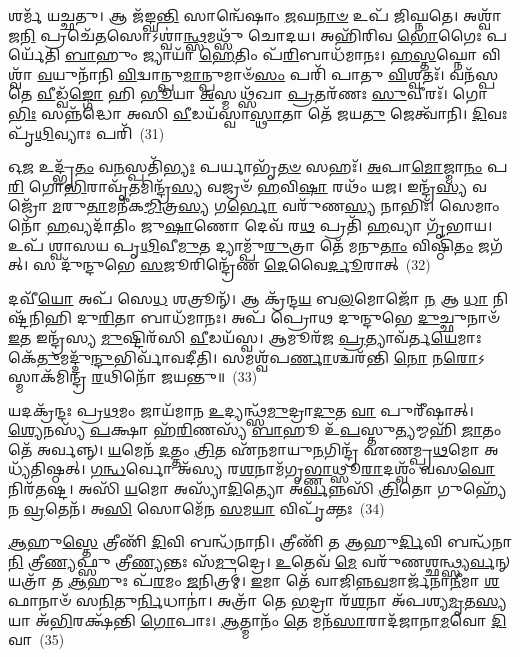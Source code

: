 𑌶𑌰𑍍𑌮᳴ 𑌯𑌚𑍍𑌛𑌤𑍁। 𑌆 𑌜᳴𑌙𑍍𑌘\-\ul{𑌨𑍍𑌤𑌿} 𑌸𑌾𑌨𑍍𑌵𑍇᳴𑌷𑌾𑌂 \ul{𑌜}\-𑌘\-\ul{𑌨𑌾}\-\-\ul{𑍞} 𑌉𑌪᳴ 𑌜𑌿𑌘𑍍𑌨𑌤𑍇। 𑌅𑌶𑍍𑌵𑌾᳴𑌜\-\ul{𑌨𑌿} 𑌪𑍍𑌰𑌚𑍇᳴\-\ul{𑌤}\-𑌸𑍋\-𑌽𑌶𑍍𑌵𑌾॑\-\ul{𑌨𑍍𑌥𑍍𑌸}\-𑌮𑌥𑍍𑌸𑍁᳴ 𑌚𑍋𑌦𑌯। 𑌅𑌹𑌿᳴𑌰𑌿𑌵 \ul{𑌭𑍋}\-𑌗𑍈𑌃 𑌪𑌰𑍍𑌯𑍇᳴𑌤𑌿 \ul{𑌬𑌾}\-𑌹𑍁𑌂 𑌜𑍍𑌯𑌾𑌯𑌾᳴ \ul{𑌹𑍇}\-𑌤𑌿𑌂 𑌪᳴\-\ul{𑌰𑌿}\-𑌬𑌾𑌧᳴𑌮𑌾𑌨𑌃। \ul{𑌹}\-\-\ul{𑌸𑍍𑌤}\-𑌘𑍍𑌨𑍋 𑌵𑌿𑌶𑍍𑌵𑌾᳴ \ul{𑌵}\-𑌯𑍁𑌨𑌾᳴𑌨𑌿 \ul{𑌵𑌿}\-𑌦𑍍𑌵𑌾𑌨𑍍𑌪𑍁\-\ul{𑌮𑌾}\-𑌨𑍍𑌪𑍁𑌮𑌾𑍞᳴\-\ul{𑌸𑌂} 𑌪𑌰𑌿᳴ 𑌪𑌾𑌤𑍁 \ul{𑌵𑌿}\-𑌶𑍍𑌵𑌤𑌃᳴। 𑌵𑌨᳴𑌸𑍍𑌪𑌤𑍇 \ul{𑌵𑍀}\-𑌡𑍍𑌵᳴\-\ul{𑌙𑍍𑌗𑍋} 𑌹𑌿 \ul{𑌭𑍂}\-𑌯𑌾 \ul{𑌅}\-𑌸𑍍𑌮𑌥𑍍𑌸᳴𑌖𑌾 \ul{𑌪𑍍𑌰}\-𑌤𑌰᳴𑌣𑌃 \ul{𑌸𑍁}\-𑌵𑍀𑌰𑌃᳴। 𑌗𑍋\-\ul{𑌭𑌿𑌃} 𑌸𑌨𑍍𑌨᳴𑌦𑍍𑌧𑍋 𑌅𑌸𑌿 \ul{𑌵𑍀}\-𑌡𑌯᳴𑌸𑍍𑌵𑌾\-\ul{𑌸𑍍𑌥𑌾}\-𑌤𑌾 𑌤𑍇᳴ 𑌜𑌯\-\ul{𑌤𑍁} 𑌜𑍇𑌤𑍍𑌵𑌾᳴𑌨𑌿। \ul{𑌦𑌿}\-𑌵𑌃 𑌪𑍃᳴\-\ul{𑌥𑌿}\-𑌵𑍍𑌯𑌾𑌃 𑌪𑌰𑌿᳴~(31)

𑌓\-\ul{𑌜} 𑌉𑌦𑍍𑌭𑍃᳴\-\ul{𑌤𑌂} 𑌵\-\ul{𑌨}\-𑌸𑍍𑌪𑌤𑌿᳴\-\ul{𑌭𑍍𑌯𑌃} 𑌪𑌰𑍍𑌯𑌾𑌭𑍃᳴\-\ul{𑌤}\-\-\ul{𑍞} 𑌸𑌹𑌃᳴। \ul{𑌅}\-𑌪𑌾\-\ul{𑌮𑍋}\-𑌜𑍍𑌮𑌾\-\ul{𑌨𑌂} 𑌪\-\ul{𑌰𑌿} 𑌗𑍋\-\ul{𑌭𑌿}\-𑌰𑌾𑌵𑍃᳴\-\ul{𑌤}\-𑌮𑌿𑌨𑍍𑌦𑍍𑌰᳴\-\ul{𑌸𑍍𑌯} 𑌵𑌜𑍍𑌰𑍞᳴ \ul{𑌹}\-𑌵𑌿\-\ul{𑌷𑌾} 𑌰𑌥𑌂᳴ 𑌯𑌜। 𑌇𑌨𑍍𑌦𑍍𑌰᳴\-\ul{𑌸𑍍𑌯} 𑌵𑌜𑍍𑌰𑍋᳴ \ul{𑌮}\-𑌰𑍁\-\ul{𑌤𑌾}\-𑌮𑌨𑍀᳴𑌕\-\ul{𑌮𑍍𑌮𑌿}\-𑌤𑍍𑌰\-\ul{𑌸𑍍𑌯} 𑌗\-\ul{𑌰𑍍𑌭𑍋} 𑌵𑌰𑍁᳴𑌣\-\ul{𑌸𑍍𑌯} 𑌨𑌾𑌭𑌿𑌃᳴। 𑌸𑍇𑌮𑌾𑌂 𑌨𑍋᳴ \ul{𑌹}\-𑌵𑍍𑌯𑌦𑌾᳴𑌤𑌿𑌂 𑌜𑍁\-\ul{𑌷𑌾}\-𑌣𑍋 𑌦𑍇𑌵᳴ 𑌰\-\ul{𑌥} 𑌪𑍍𑌰𑌤𑌿᳴ \ul{𑌹}\-𑌵𑍍𑌯𑌾 𑌗𑍃᳴𑌭𑌾𑌯। 𑌉𑌪᳴ 𑌶𑍍𑌵𑌾𑌸𑌯 𑌪𑍃\-\ul{𑌥𑌿}\-𑌵𑍀\-\ul{𑌮𑍁}\-𑌤 𑌦𑍍𑌯𑌾𑌮𑍍𑌪𑍁᳴\-\ul{𑌰𑍁}\-𑌤𑍍𑌰𑌾 𑌤𑍇᳴ 𑌮𑌨𑍁\-\ul{𑌤𑌾𑌂} 𑌵𑌿𑌷𑍍𑌠𑌿᳴\-\ul{𑌤𑌂} 𑌜𑌗᳴𑌤𑍍। 𑌸 𑌦𑍁᳴𑌨𑍍𑌦𑍁𑌭𑍇 \ul{𑌸}\-𑌜𑍂𑌰𑌿𑌨𑍍𑌦𑍍𑌰𑍇᳴𑌣 \ul{𑌦𑍇}\-𑌵𑍈\-\ul{𑌰𑍍𑌦𑍂}\-𑌰𑌾𑌤𑍍~(32)

𑌦𑌵𑍀᳴\-\ul{𑌯𑍋} 𑌅𑌪᳴ 𑌸𑍇\-\ul{𑌧} 𑌶𑌤𑍍𑌰𑍂𑌨𑍍᳴। 𑌆 𑌕𑍍𑌰᳴𑌨𑍍𑌦\-\ul{𑌯} 𑌬\-\ul{𑌲}\-𑌮𑍋𑌜𑍋᳴ \ul{𑌨} 𑌆 \ul{𑌧𑌾} 𑌨𑌿 𑌷𑍍𑌟᳴𑌨𑌿𑌹𑌿 𑌦𑍁\-\ul{𑌰𑌿}\-𑌤𑌾 𑌬𑌾𑌧᳴𑌮𑌾𑌨𑌃। 𑌅𑌪᳴ 𑌪𑍍𑌰𑍋𑌥 𑌦𑍁𑌨𑍍𑌦𑍁𑌭𑍇 \ul{𑌦𑍁}\-𑌚𑍍𑌛𑍁𑌨𑌾𑍞᳴ \ul{𑌇}\-𑌤 𑌇𑌨𑍍𑌦𑍍𑌰᳴𑌸𑍍𑌯 \ul{𑌮𑍁}\-𑌷𑍍𑌟𑌿𑌰᳴𑌸𑌿 \ul{𑌵𑍀}\-𑌡𑌯᳴𑌸𑍍𑌵। 𑌆𑌮𑍂𑌰᳴𑌜 \ul{𑌪𑍍𑌰}\-𑌤𑍍𑌯𑌾𑌵᳴𑌰𑍍𑌤\-\ul{𑌯𑍇}\-𑌮𑌾𑌃 𑌕𑍇᳴\-\ul{𑌤𑍁}\-𑌮𑌦𑍍𑌦𑍁᳴\-\ul{𑌨𑍍𑌦𑍁}\-𑌭𑌿𑌰𑍍𑌵𑌾᳴𑌵𑌦𑍀𑌤𑌿। 𑌸𑌮𑌶𑍍𑌵᳴𑌪\-\ul{𑌰𑍍𑌣𑌾}\-𑌶𑍍𑌚𑌰᳴𑌨𑍍𑌤𑌿 \ul{𑌨𑍋} 𑌨\-\ul{𑌰𑍋}\-\-𑌽𑌸𑍍𑌮𑌾𑌕᳴𑌮𑌿𑌨𑍍𑌦𑍍𑌰 \ul{𑌰}\-𑌥𑌿𑌨𑍋᳴ 𑌜𑌯𑌨𑍍𑌤𑍁॥~(33)

{\anuvakamend[{𑌧𑌨𑍍𑌵᳴𑌨𑍍𑌮\-\ul{𑌹𑌿}\-𑌮𑌾\-\ul{𑌨𑌂} 𑌬𑍍𑌰𑌾𑌹𑍍𑌮᳴\-\ul{𑌣𑌾}\-𑌸𑍋\-𑌽𑌦𑌿᳴𑌤𑌿𑌃 𑌪𑍃\-\ul{𑌥𑌿}\-𑌵𑍍𑌯𑌾𑌃 𑌪𑌰𑌿᳴ \ul{𑌦𑍂}\-𑌰𑌾𑌦𑍇𑌕᳴𑌚𑌤𑍍𑌵𑌾𑌰𑌿𑍞𑌶𑌚𑍍𑌚}]}%

𑌯𑌦𑌕𑍍𑌰᳴𑌨𑍍𑌦𑌃 𑌪𑍍𑌰\-\ul{𑌥}\-𑌮𑌂 𑌜𑌾𑌯᳴𑌮𑌾𑌨 \ul{𑌉}\-𑌦𑍍𑌯𑌨𑍍𑌥𑍍𑌸᳴\-\ul{𑌮𑍁}\-𑌦𑍍𑌰𑌾\-\ul{𑌦𑍁}\-𑌤 \ul{𑌵𑌾} 𑌪𑍁𑌰𑍀᳴𑌷𑌾𑌤𑍍। \ul{𑌶𑍍𑌯𑍇}\-𑌨𑌸𑍍𑌯᳴ \ul{𑌪}\-𑌕𑍍𑌷𑌾 𑌹᳴\-\ul{𑌰𑌿}\-𑌣𑌸𑍍𑌯᳴ \ul{𑌬𑌾}\-𑌹𑍂 𑌉᳴\-\ul{𑌪}\-𑌸𑍍𑌤𑍁\-\ul{𑌤𑍍𑌯}\-𑌮𑍍𑌮𑌹𑌿᳴ \ul{𑌜𑌾}\-𑌤𑌂 𑌤𑍇᳴ 𑌅𑌰𑍍𑌵𑌨𑍍𑌨𑍍। \ul{𑌯}\-𑌮𑍇𑌨᳴ \ul{𑌦}\-𑌤𑍍𑌤𑌂 \ul{𑌤𑍍𑌰𑌿}\-𑌤 𑌏᳴𑌨𑌮𑌾𑌯𑍁\-\ul{𑌨}\-𑌗𑌿𑌨𑍍𑌦𑍍𑌰᳴ 𑌏𑌣𑌮𑍍𑌪𑍍𑌰\-\ul{𑌥}\-𑌮𑍋 𑌅𑌧𑍍𑌯᳴𑌤𑌿𑌷𑍍𑌠𑌤𑍍। \ul{𑌗}\-\-\ul{𑌨𑍍𑌧}\-𑌰𑍍𑌵𑍋 𑌅᳴𑌸𑍍𑌯 𑌰\-\ul{𑌶}\-𑌨𑌾𑌮᳴𑌗𑍃\-\ul{𑌭𑍍𑌣𑌾}\-𑌥𑍍𑌸𑍂\-\ul{𑌰𑌾}\-𑌦𑌶𑍍𑌵𑌂᳴ 𑌵𑌸\-\ul{𑌵𑍋} 𑌨𑌿𑌰᳴𑌤𑌷𑍍𑌟। 𑌅𑌸𑌿᳴ \ul{𑌯}\-𑌮𑍋 𑌅𑌸𑍍𑌯𑌾᳴\-\ul{𑌦𑌿}\-𑌤𑍍𑌯𑍋 𑌅᳴\-\ul{𑌰𑍍𑌵}\-𑌨𑍍𑌨𑌸𑌿᳴ \ul{𑌤𑍍𑌰𑌿}\-𑌤𑍋 𑌗𑍁𑌹𑍍𑌯𑍇᳴𑌨 \ul{𑌵𑍍𑌰}\-𑌤𑍇𑌨᳴। 𑌅\-\ul{𑌸𑌿} 𑌸𑍋𑌮𑍇᳴𑌨 \ul{𑌸}\-𑌮\-\ul{𑌯𑌾} 𑌵𑌿𑌪𑍃᳴𑌕𑍍𑌤𑌃~(34)

\-\ul{𑌆}\-𑌹𑍁\-\ul{𑌸𑍍𑌤𑍇} 𑌤𑍍𑌰𑍀𑌣𑌿᳴ \ul{𑌦𑌿}\-𑌵𑌿 𑌬𑌨𑍍𑌧᳴𑌨𑌾𑌨𑌿। 𑌤𑍍𑌰𑍀𑌣𑌿᳴ 𑌤 𑌆𑌹𑍁\-\ul{𑌰𑍍𑌦𑌿}\-𑌵𑌿 𑌬𑌨𑍍𑌧᳴𑌨𑌾\-\ul{𑌨𑌿} 𑌤𑍍𑌰𑍀\-\ul{𑌣𑍍𑌯}\-𑌫𑍍𑌸𑍁 𑌤𑍍𑌰𑍀\-\ul{𑌣𑍍𑌯}\-𑌨𑍍𑌤𑌃 𑌸᳴\-\ul{𑌮𑍁}\-𑌦𑍍𑌰𑍇। \ul{𑌉}\-𑌤𑍇𑌵᳴ \ul{𑌮𑍇} 𑌵𑌰𑍁᳴𑌣𑌶𑍍𑌛𑌨𑍍𑌥𑍍𑌸𑍍𑌯\-\ul{𑌰𑍍𑌵}\-𑌨𑍍 𑌯𑌤𑍍𑌰𑌾᳴ 𑌤 \ul{𑌆}\-𑌹𑍁𑌃 𑌪᳴\-\ul{𑌰}\-𑌮𑌂 \ul{𑌜}\-𑌨𑌿𑌤𑍍𑌰𑌮𑍍॑। \ul{𑌇}\-𑌮𑌾 𑌤𑍇᳴ 𑌵𑌾𑌜𑌿𑌨𑍍𑌨\-\ul{𑌵}\-𑌮𑌾𑌰𑍍𑌜᳴𑌨𑌾\-\ul{𑌨𑍀}\-𑌮𑌾 \ul{𑌶}\-𑌫𑌾𑌨𑌾𑍞᳴ 𑌸\-\ul{𑌨𑌿}\-𑌤𑍁\-\ul{𑌰𑍍𑌨𑌿}\-𑌧𑌾𑌨𑌾॑। 𑌅𑌤𑍍𑌰𑌾᳴ 𑌤𑍇 \ul{𑌭}\-𑌦𑍍𑌰𑌾 𑌰᳴\-\ul{𑌶}\-𑌨𑌾 𑌅᳴𑌪𑌶𑍍𑌯\-\ul{𑌮𑍃}\-𑌤\-\ul{𑌸𑍍𑌯} 𑌯𑌾 𑌅᳴\-\ul{𑌭𑌿}\-𑌰𑌕𑍍𑌷᳴𑌨𑍍𑌤𑌿 \ul{𑌗𑍋}\-𑌪𑌾𑌃। \ul{𑌆}\-𑌤𑍍𑌮𑌾𑌨𑌂᳴ \ul{𑌤𑍇} 𑌮𑌨᳴\-\ul{𑌸𑌾}\-𑌰𑌾𑌦᳴𑌜𑌾𑌨𑌾\-\ul{𑌮}\-𑌵𑍋 \ul{𑌦𑌿}\-𑌵𑌾~(35)

